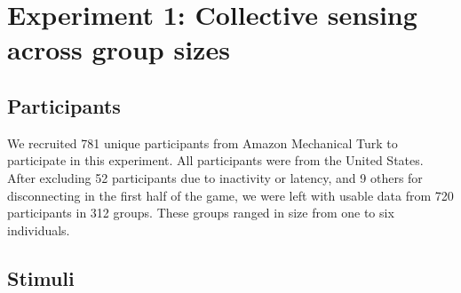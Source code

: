 \documentclass[12pt,letterpaper]{article}
\begin{document}



\section{Experiment 1: Collective sensing across group sizes}

\subsection{Participants}
We recruited 781 unique participants from Amazon Mechanical Turk to participate in this experiment.  All participants were from the United States.  After excluding 52 participants due to inactivity or latency, and 9 others for disconnecting in the first half of the game, we were left with usable data from 720 participants in 312 groups.  These groups ranged in size from one to six individuals. 

\subsection{Stimuli}
\end{document}
